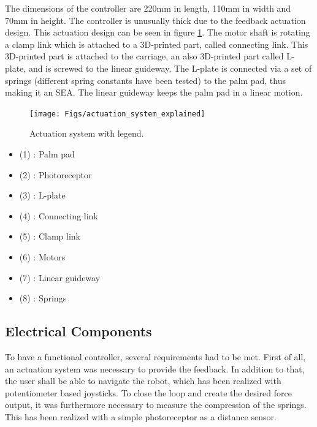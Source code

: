 	
	
The dimensions of the controller are 220mm in length, 110mm in width and 70mm in height. The controller is unusually thick due to the feedback actuation design. This actuation design can be seen in figure \ref{fig:actuation_system_explained}. The motor shaft is rotating a clamp link which is attached to a 3D-printed part, called connecting link. This 3D-printed part is attached to the carriage, an also 3D-printed part called L-plate, and is screwed to the linear guideway. The L-plate is connected via a set of springs (different spring constants have been tested) to the palm pad, thus making it an SEA. The linear guideway keeps the palm pad in a linear motion.

\begin{minipage}{0.7\textwidth}
\begin{figure}[H]
	\centering
	\texttt{[image: Figs/actuation\_system\_explained]}
	\caption{Actuation system with legend.}
	\label{fig:actuation_system_explained}
\end{figure}
\end{minipage}
\begin{minipage}{0.29\textwidth}
	\begin{itemize}
    	\item (1) : Palm pad
    	\item (2) : Photoreceptor
    	\item (3) : L-plate
    	\item (4) : Connecting link
    	\item (5) : Clamp link
    	\item (6) : Motors
    	\item (7) : Linear guideway
    	\item (8) : Springs
    \end{itemize}
\end{minipage}

\subsection{Electrical Components}
To have a functional controller, several requirements had to be met. First of all, an actuation system was necessary to provide the feedback. In addition to that, the user shall be able to navigate the robot, which has been realized with potentiometer based joysticks. To close the loop and create the desired force output, it was furthermore necessary to measure the compression of the springs. This has been realized with a simple photoreceptor as a distance sensor.

